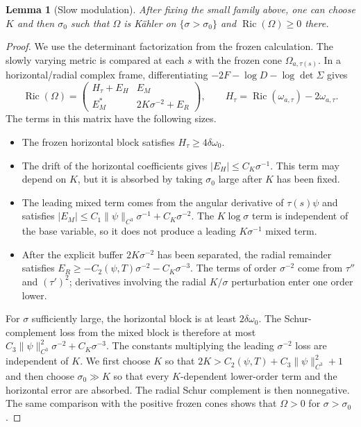 \documentclass[11pt]{amsart}
\newtheorem{lemma}[theorem]{Lemma}
\theoremstyle{definition}
\theoremstyle{remark}
\begin{document}
\begin{lemma}[Slow modulation]
\label{lem:appendix-slow-modulation}
After fixing the small family above, one can choose $K$ and then $\sigma_0$ such that $\Omega$ is K\"ahler on $\{\sigma>\sigma_0\}$ and $\operatorname{Ric}(\Omega)\geq0$ there.
\end{lemma}

\begin{proof}
We use the determinant factorization from the frozen calculation.  The slowly varying metric is compared at each $s$ with the frozen cone $\Omega_{a,\tau(s)}$.  In a horizontal/radial complex frame, differentiating $-2F-\log D-\log\det\Sigma$ gives
\begin{equation}\label{eq:appendix-ricci-block}
\operatorname{Ric}(\Omega)=
\begin{pmatrix}
H_{\tau}+E_H&E_M\\
E_M^*&2K\sigma^{-2}+E_R
\end{pmatrix},
\qquad
H_{\tau}=\operatorname{Ric}(\omega_{a,\tau})-2\omega_{a,\tau}.
\end{equation}
The terms in this matrix have the following sizes.
\begin{itemize}
\item The frozen horizontal block satisfies $H_\tau\geq4\delta\omega_0$.
\item The drift of the horizontal coefficients gives $|E_H|\leq C_K\sigma^{-1}$.  This term may depend on $K$, but it is absorbed by taking $\sigma_0$ large after $K$ has been fixed.
\item The leading mixed term comes from the angular derivative of $\tau(s)\psi$ and satisfies $|E_M|\leq C_1\|\psi\|_{C^3}\sigma^{-1}+C_K\sigma^{-2}$.  The $K\log\sigma$ term is independent of the base variable, so it does not produce a leading $K\sigma^{-1}$ mixed term.
\item After the explicit buffer $2K\sigma^{-2}$ has been separated, the radial remainder satisfies $E_R\geq-C_2(\psi,T)\sigma^{-2}-C_K\sigma^{-3}$.  The terms of order $\sigma^{-2}$ come from $\tau''$ and $(\tau')^2$; derivatives involving the radial $K/\sigma$ perturbation enter one order lower.
\end{itemize}
For $\sigma$ sufficiently large, the horizontal block is at least $2\delta\omega_0$.  The Schur-complement loss from the mixed block is therefore at most $C_3\|\psi\|_{C^3}^2\sigma^{-2}+C_K\sigma^{-3}$.  The constants multiplying the leading $\sigma^{-2}$ loss are independent of $K$.  We first choose $K$ so that $2K>C_2(\psi,T)+C_3\|\psi\|_{C^3}^2+1$ and then choose $\sigma_0\gg K$ so that every $K$-dependent lower-order term and the horizontal error are absorbed.  The radial Schur complement is then nonnegative.  The same comparison with the positive frozen cones shows that $\Omega>0$ for $\sigma>\sigma_0$.
\end{proof}
\end{document}
